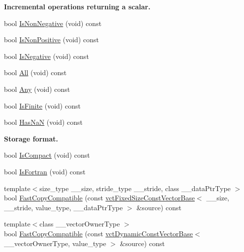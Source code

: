 \begin{Indent}{\bf Incremental operations returning a scalar.}
\begin{DoxyCompactItemize}
\item 
bool \hyperlink{classvct_fixed_size_const_vector_base_a0dd3b76cdec4fa3b54816cb878c5cb28}{Is\-Non\-Negative} (void) const 
\item 
bool \hyperlink{classvct_fixed_size_const_vector_base_a4158db8c718b0fe65cd9a2328d9cac0b}{Is\-Non\-Positive} (void) const 
\item 
bool \hyperlink{classvct_fixed_size_const_vector_base_a9306ec231b0528ef5b881461ea1ff8d8}{Is\-Negative} (void) const 
\item 
bool \hyperlink{classvct_fixed_size_const_vector_base_a302eaee9662d01603781e2f29bdaaebe}{All} (void) const 
\item 
bool \hyperlink{classvct_fixed_size_const_vector_base_aa3a86b1d3cae13dae3c33bd8541f4406}{Any} (void) const 
\item 
bool \hyperlink{classvct_fixed_size_const_vector_base_a7cf413f6effa64e31fe306f9ac11a97d}{Is\-Finite} (void) const 
\item 
bool \hyperlink{classvct_fixed_size_const_vector_base_a542964b8e6a6e430b24a50db0b9bf591}{Has\-Na\-N} (void) const 
\end{DoxyCompactItemize}
\end{Indent}
\begin{Indent}{\bf Storage format.}\par
\begin{DoxyCompactItemize}
\item 
bool \hyperlink{classvct_fixed_size_const_vector_base_ae3938e1b5a4e3822889f584568ba6629}{Is\-Compact} (void) const 
\item 
bool \hyperlink{classvct_fixed_size_const_vector_base_a29f89413c10a8bc6f266d43baa57b758}{Is\-Fortran} (void) const 
\item 
{\footnotesize template$<$size\-\_\-type \-\_\-\-\_\-size, stride\-\_\-type \-\_\-\-\_\-stride, class \-\_\-\-\_\-data\-Ptr\-Type $>$ }\\bool \hyperlink{classvct_fixed_size_const_vector_base_a01d4cd7d810371fa09e5e7154fb294bc}{Fast\-Copy\-Compatible} (const \hyperlink{classvct_fixed_size_const_vector_base}{vct\-Fixed\-Size\-Const\-Vector\-Base}$<$ \-\_\-\-\_\-size, \-\_\-\-\_\-stride, value\-\_\-type, \-\_\-\-\_\-data\-Ptr\-Type $>$ \&source) const 
\item 
{\footnotesize template$<$class \-\_\-\-\_\-vector\-Owner\-Type $>$ }\\bool \hyperlink{classvct_fixed_size_const_vector_base_ad85b7a0580923858f7bc6aa7bfcc60fb}{Fast\-Copy\-Compatible} (const \hyperlink{classvct_dynamic_const_vector_base}{vct\-Dynamic\-Const\-Vector\-Base}$<$ \-\_\-\-\_\-vector\-Owner\-Type, value\-\_\-type $>$ \&source) const 
\end{DoxyCompactItemize}
\end{Indent}
